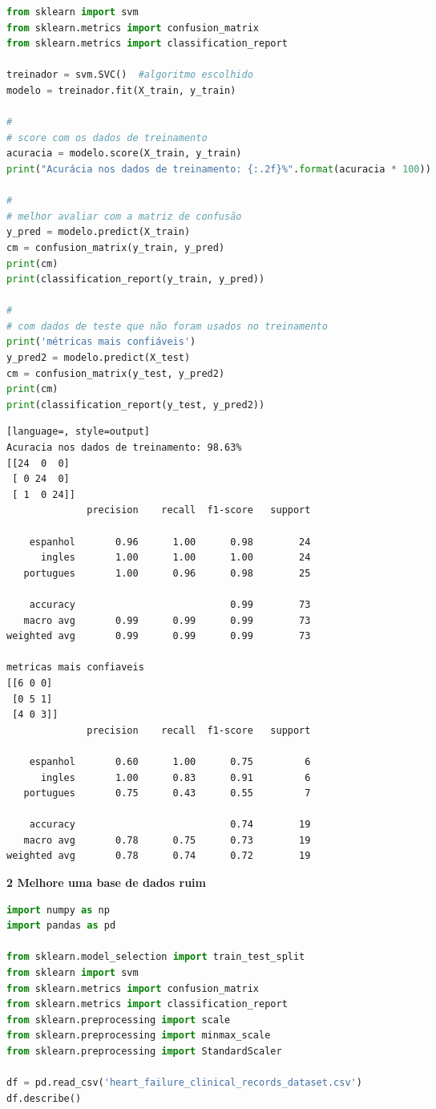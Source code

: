 \begin{lstlisting}[language=Python, style=input]
  from sklearn import svm
from sklearn.metrics import confusion_matrix
from sklearn.metrics import classification_report

treinador = svm.SVC()  #algoritmo escolhido
modelo = treinador.fit(X_train, y_train)

#
# score com os dados de treinamento
acuracia = modelo.score(X_train, y_train)
print("Acurácia nos dados de treinamento: {:.2f}%".format(acuracia * 100))

#
# melhor avaliar com a matriz de confusão
y_pred = modelo.predict(X_train)
cm = confusion_matrix(y_train, y_pred)
print(cm)
print(classification_report(y_train, y_pred))

#
# com dados de teste que não foram usados no treinamento
print('métricas mais confiáveis')
y_pred2 = modelo.predict(X_test)
cm = confusion_matrix(y_test, y_pred2)
print(cm)
print(classification_report(y_test, y_pred2))
\end{lstlisting}


\begin{lstlisting}[language=, style=output]
Acuracia nos dados de treinamento: 98.63%
[[24  0  0]
 [ 0 24  0]
 [ 1  0 24]]
              precision    recall  f1-score   support

    espanhol       0.96      1.00      0.98        24
      ingles       1.00      1.00      1.00        24
   portugues       1.00      0.96      0.98        25

    accuracy                           0.99        73
   macro avg       0.99      0.99      0.99        73
weighted avg       0.99      0.99      0.99        73

metricas mais confiaveis
[[6 0 0]
 [0 5 1]
 [4 0 3]]
              precision    recall  f1-score   support

    espanhol       0.60      1.00      0.75         6
      ingles       1.00      0.83      0.91         6
   portugues       0.75      0.43      0.55         7

    accuracy                           0.74        19
   macro avg       0.78      0.75      0.73        19
weighted avg       0.78      0.74      0.72        19
\end{lstlisting}


\begin{adjustwidth}{1em}{}
\textbf{2 Melhore uma base de dados ruim}
\end{adjustwidth}


\begin{lstlisting}[language=Python, style=input]
import numpy as np
import pandas as pd

from sklearn.model_selection import train_test_split
from sklearn import svm
from sklearn.metrics import confusion_matrix
from sklearn.metrics import classification_report
from sklearn.preprocessing import scale
from sklearn.preprocessing import minmax_scale
from sklearn.preprocessing import StandardScaler

df = pd.read_csv('heart_failure_clinical_records_dataset.csv')
df.describe()
\end{lstlisting}

